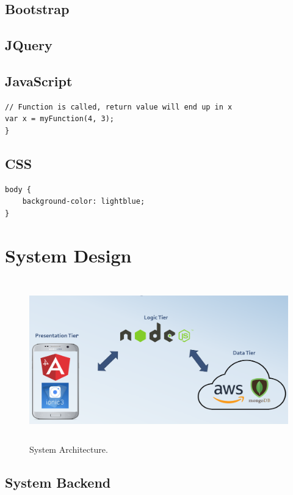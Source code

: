 \section{Bootstrap}

\section{JQuery}


\section{JavaScript}

\begin{verbatim}
// Function is called, return value will end up in x
var x = myFunction(4, 3);   
}
\end{verbatim}

\section{CSS}


\begin{verbatim}
body {
    background-color: lightblue;
}
\end{verbatim}

\chapter{System Design}

\begin{figure}[h]
\centering
\includegraphics[width=14cm, height=7cm]{img/Architecture}
\caption{System Architecture.}
\end{figure}

\section{System Backend}


